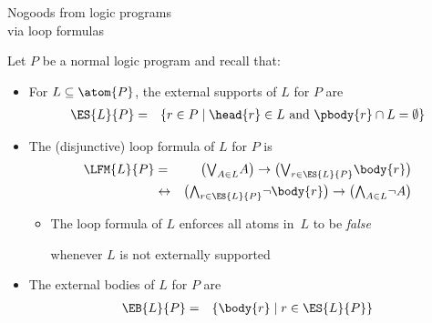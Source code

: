 \begin{frame}{Nogoods from logic programs\\[-1ex]\normalsize via loop formulas}

  Let $P$ be a normal logic program and recall that:
  \begin{itemize}
  \item <1->
    For $L\subseteq\atom{P}$,
    the external supports of $L$ for $P$ are
    \begin{eqnarray*}
      \ES{L}{P}
      & = &
      \{r\in P\mid\head{r}\in L \text{ and } \pbody{r}\cap L=\emptyset\}
    \end{eqnarray*}

  \item <2->
    The (disjunctive) loop formula of $L$ for $P$ is
    \begin{eqnarray*}
      \LFM{L}{P}
      & = &
      \big(
      \mbox{$\bigvee_{A\in L}$} A
      \big)
      \rightarrow
      \big(
      \mbox{$\bigvee_{r\in\ES{L}{P}}$}
      {\body{r}}
      \big)
      \\
      & \leftrightarrow &
      \big(
      \mbox{$\bigwedge_{r\in\ES{L}{P}}$}
      \neg%
      {\body{r}}
      \big)
      \rightarrow
      \big(
      \mbox{$\bigwedge_{A\in L}$}\neg A
      \big)
    \end{eqnarray*}
    \vspace*{-4mm}
    \begin{itemize}
    \item {}
      The loop formula of $L$ enforces
      all atoms in~$L$ to be \emph{false}
      \par
      whenever $L$ is not externally supported
    \end{itemize}

  \item <3-> The external bodies of $L$ for $P$ are
    \begin{eqnarray*}
      \EB{L}{P} & = & \{\body{r} \mid r\in \ES{L}{P}\}
    \end{eqnarray*}
  \end{itemize}
\end{frame}
